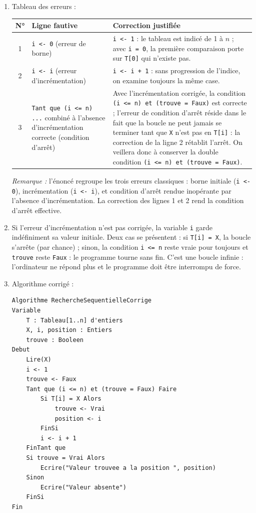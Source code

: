 \documentclass[11pt]{article}
\newcommand{\cle}[1]{{\popxbold\color{popdark}#1}}
\begin{document}
\begin{corrige}
\begin{enumerate}
\item Tableau des erreurs :

\begin{center}
\begin{tabularx}{\linewidth}{|c|X|X|}
\hline
\rowcolor{popblueL} N° & Ligne fautive & Correction justifiée \\
\hline
1 & \texttt{i <- 0} (erreur de borne) & \texttt{i <- 1} : le tableau est indicé de 1 à $n$ ; avec \texttt{i = 0}, la première comparaison porte sur \texttt{T[0]} qui n'existe pas. \\
\hline
2 & \texttt{i <- i} (erreur d'incrémentation) & \texttt{i <- i + 1} : sans progression de l'indice, on examine toujours la même case. \\
\hline
3 & \texttt{Tant que (i <= n) ...} combiné à l'absence d'incrémentation correcte (condition d'arrêt) & Avec l'incrémentation corrigée, la condition \texttt{(i <= n) et (trouve = Faux)} est correcte ; l'erreur de condition d'arrêt réside dans le fait que la boucle ne peut jamais se terminer tant que \texttt{X} n'est pas en \texttt{T[i]} : la correction de la ligne 2 rétablit l'arrêt. On veillera donc à conserver la double condition \texttt{(i <= n) et (trouve = Faux)}. \\
\hline
\end{tabularx}
\end{center}

\textit{Remarque :} l'énoncé regroupe les trois erreurs classiques : borne initiale (\texttt{i <- 0}), incrémentation (\texttt{i <- i}), et condition d'arrêt rendue inopérante par l'absence d'incrémentation. La correction des lignes 1 et 2 rend la condition d'arrêt effective.

\item Si l'erreur d'incrémentation n'est pas corrigée, la variable \texttt{i} garde indéfiniment sa valeur initiale. Deux cas se présentent : si \texttt{T[i] = X}, la boucle s'arrête (par chance) ; sinon, la condition \texttt{i <= n} reste vraie pour toujours et \texttt{trouve} reste \texttt{Faux} : le programme tourne sans fin. C'est une \cle{boucle infinie} : l'ordinateur ne répond plus et le programme doit être interrompu de force.

\item Algorithme corrigé :

\begin{lstlisting}
Algorithme RechercheSequentielleCorrige
Variable
    T : Tableau[1..n] d'entiers
    X, i, position : Entiers
    trouve : Booleen
Debut
    Lire(X)
    i <- 1
    trouve <- Faux
    Tant que (i <= n) et (trouve = Faux) Faire
        Si T[i] = X Alors
            trouve <- Vrai
            position <- i
        FinSi
        i <- i + 1
    FinTant que
    Si trouve = Vrai Alors
        Ecrire("Valeur trouvee a la position ", position)
    Sinon
        Ecrire("Valeur absente")
    FinSi
Fin
\end{lstlisting}


\end{enumerate}
\end{corrige}
\end{document}
